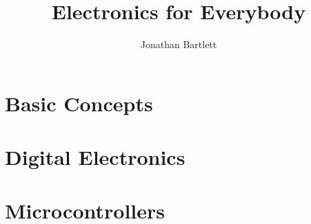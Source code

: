 \documentclass{book}
\begin{document}
\sloppy

\frontmatter

\title{Electronics for Everybody}
\author{Jonathan Bartlett}



\tableofcontents

\mainmatter









\part{Basic Concepts}









\part{Digital Electronics}






\part{Microcontrollers}




\end{document}

